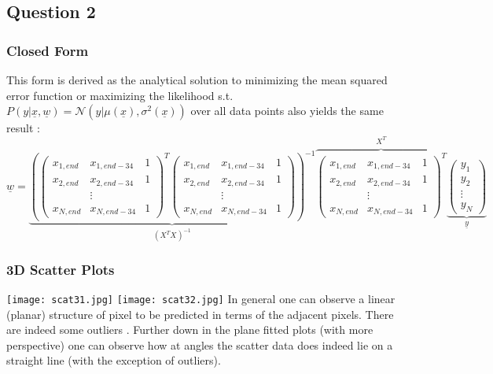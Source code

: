 \documentclass[11pt]{article}
\begin{document}
\subsection{Question 2}
\subsubsection{Closed Form}

This form is derived as the analytical solution to minimizing the mean squared error function or maximizing the likelihood  s.t. $P(y | \underline{x}, \underline{w}) = \mathcal{N}(y | \mu(\underline{x}), \sigma^{2}(\underline{x}) )$ over all data points also yields the same result :
\[\underline{w} =\underbrace{\left( \left( \begin{array}{ccc}
x_{1, end} & x_{1, end -34} & 1 \\
x_{2, end} & x_{2, end -34} & 1 \\
&\vdots &\\
x_{N, end} & x_{N, end -34} & 1 \end{array} \right)^{T}
\left( \begin{array}{ccc}
x_{1, end} & x_{1, end -34} & 1 \\
x_{2, end} & x_{2, end -34} & 1 \\
&\vdots &\\
x_{N, end} & x_{N, end -34} & 1 \end{array} \right) \right) ^{-1} }_{(X_{}^{T}X_{})^{-1}} \overbrace{\left( \begin{array}{ccc}
x_{1, end} & x_{1, end -34} & 1 \\
x_{2, end} & x_{2, end -34} & 1 \\
&\vdots &\\
x_{N, end} & x_{N, end -34} & 1 \end{array} \right)^{T}}^{X_{}^T}
 \underbrace{\left( \begin{array}{c}
y_{1}  \\
y_{2}  \\
\vdots \\
y_{N}  \end{array} \right)}_{\underline{y} }\] 


%
%
\subsubsection{3D Scatter Plots}


\texttt{[image: scat31.jpg]}
\texttt{[image: scat32.jpg]}
\newline\newline
In general one can observe a linear (planar) structure of pixel to be predicted in terms of the adjacent pixels. There are indeed some outliers . Further down in the plane fitted plots  (with more perspective) one can observe how at angles the scatter data does indeed lie on a straight line (with the exception of outliers).
\newline
\end{document}
